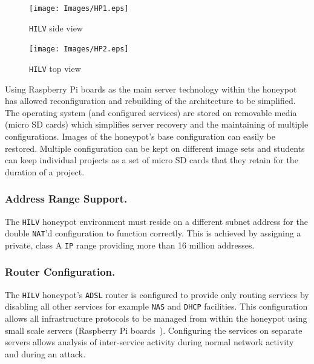 \documentclass{llncs}
\begin{document}
\begin{figure}[ht]
  \centering
  \begin{minipage}[h]{0.45\textwidth}
    \texttt{[image: Images/HP1.eps]}
    \caption{\texttt{HILV} side view\label{fig:HP1}}
  \end{minipage}
  \hfill
  \begin{minipage}[h]{0.45\textwidth}
    \texttt{[image: Images/HP2.eps]}
    \caption{\texttt{HILV} top view\label{fig:HP2}}
  \end{minipage}
\end{figure}


Using Raspberry Pi boards as the main server technology within the honeypot has
allowed reconfiguration and rebuilding of the architecture to be simplified.
The operating system (and configured services) are stored on removable media
(micro SD cards) which simplifies server recovery and the maintaining of
multiple configurations. Images of the honeypot's base configuration can easily
be restored. Multiple configuration can be kept on different image sets and
students can keep individual projects as a set of micro SD cards that they
retain for the duration of a project.

\subsubsection{Address Range Support.}

The \texttt{HILV} honeypot environment must reside on a different subnet
address for the double \texttt{NAT}'d configuration to function correctly. This
is achieved by assigning a private, class A \texttt{IP} range providing more
than 16 million addresses.

\subsubsection{Router Configuration.}

The \texttt{HILV} honeypot's \texttt{ADSL} router is configured to provide only
routing services by disabling all other services for example \texttt{NAS} and
\texttt{DHCP} facilities. This configuration allows all infrastructure
protocols to be managed from within the honeypot using small scale servers
(Raspberry Pi boards~\cite{RASP:17}). Configuring the services on separate
servers allows analysis of inter-service activity during normal network
activity and during an attack.
\end{document}
